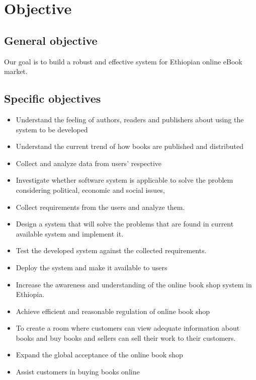 	\section{Objective}
		\subsection{General objective}

Our goal is to build a robust and effective system for Ethiopian online eBook market.

		\subsection{Specific objectives}

\begin{itemize}

	\item Understand the feeling of authors, readers and publishers about using the system to be developed
	\item Understand the current trend of how books are published and distributed
	\item Collect and analyze data from users’ respective 
	\item Investigate whether software system is applicable to solve the problem considering political, economic and social issues,
	\item Collect requirements from the users and analyze them.
	\item Design a system that will solve the problems that are found in current available system and implement it.
	\item Test the developed system against the collected requirements.
	\item Deploy the system and make it available to users
	\item Increase the awareness and understanding of the online book shop system in Ethiopia.
	\item Achieve efficient and reasonable regulation of online book shop
	\item To create a room where customers can view adequate information about books and buy books and sellers can sell their work to their customers.
	\item Expand the global acceptance of the online book shop
	\item Assist customers in buying books online

\end{itemize}


